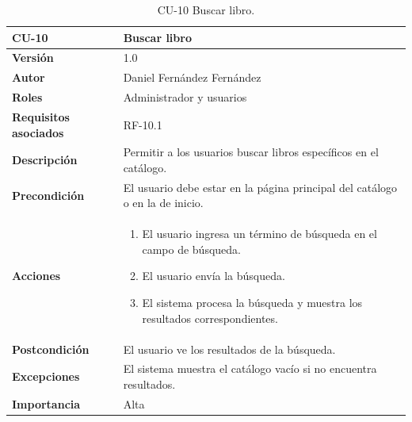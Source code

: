 \begin{table}[p]
        \centering
        \begin{tabularx}{\linewidth}{ p{} p{} }
            \toprule
            \textbf{CU-10} & \textbf{Buscar libro}\\
            \toprule
            \textbf{Versión} & 1.0 \\
            \textbf{Autor} & Daniel Fernández Fernández \\
            \textbf{Roles} & Administrador y usuarios \\
            \textbf{Requisitos asociados} & RF-10.1 \\
            \textbf{Descripción} & Permitir a los usuarios buscar libros específicos en el catálogo. \\
            \textbf{Precondición} & El usuario debe estar en la página principal del catálogo o en la de inicio. \\
            \textbf{Acciones} &
            \begin{enumerate}
            \def\labelenumi{\arabic{enumi}.}
            \tightlist
            \item El usuario ingresa un término de búsqueda en el campo de búsqueda.
            \item El usuario envía la búsqueda.
            \item El sistema procesa la búsqueda y muestra los resultados correspondientes.
            \end{enumerate}\\
            \textbf{Postcondición} & El usuario ve los resultados de la búsqueda. \\
            \textbf{Excepciones} & El sistema muestra el catálogo vacío si no encuentra resultados. \\
            \textbf{Importancia} & Alta \\
            \bottomrule
        \end{tabularx}
        \caption{CU-10 Buscar libro.}
\end{table}

